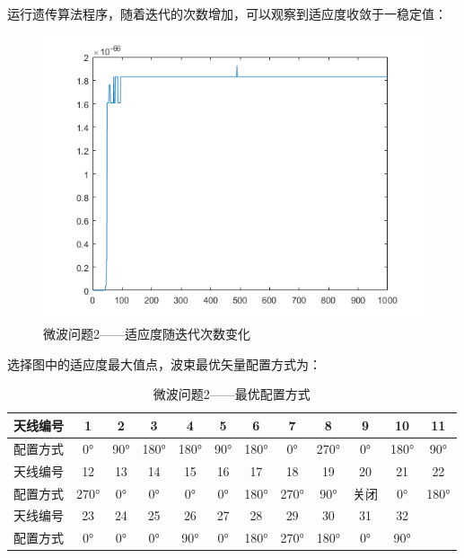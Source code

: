\documentclass[UTF8,12pt]{ctexart}
\begin{document}
运行遗传算法程序，随着迭代的次数增加，可以观察到适应度收敛于一稳定值：
\begin{figure}[H]
    \centering
    \includegraphics[scale=0.7]{lian2.png}
    \caption{微波问题2——适应度随迭代次数变化}
\end{figure}
选择图中的适应度最大值点，波束最优矢量配置方式为：
\begin{table}[htbp]
    \centering
    \caption{微波问题2——最优配置方式}
    \begin{tabular}{cccccccccccc}
        \toprule
        天线编号 & 1    & 2   & 3    & 4    & 5   & 6    & 7    & 8    & 9    & 10   & 11   \\
        \midrule
        配置方式 & 0°   & 90° & 180° & 180° & 90° & 180° & 0°   & 270° & 0°   & 180° & 90°  \\
        \midrule
        天线编号 & 12   & 13  & 14   & 15   & 16  & 17   & 18   & 19   & 20   & 21   & 22   \\
        \midrule
        配置方式 & 270° & 0°  & 0°   & 0°   & 0°  & 180° & 270° & 90°  & 关闭 & 0°   & 180° \\
        \midrule
        天线编号 & 23   & 24  & 25   & 26   & 27  & 28   & 29   & 30   & 31   & 32   &      \\
        \midrule
        配置方式 & 0°   & 0°  & 0°   & 90°  & 0°  & 180° & 270° & 180° & 0°   & 90°  &      \\
        \bottomrule
    \end{tabular}%
    \label{tab:addlabel}%
\end{table}%
\end{document}

